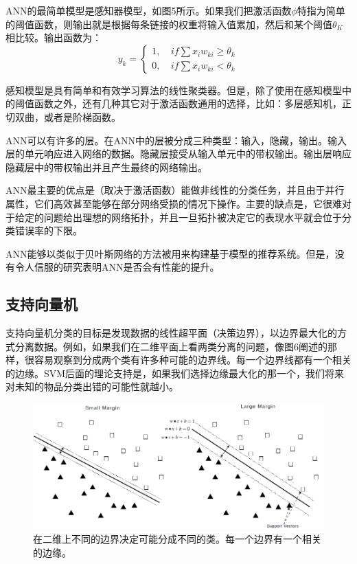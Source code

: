 \documentclass{article}
\begin{document}
ANN的最简单模型是感知器模型，如图5所示。如果我们把激活函数$\phi$特指为简单的阈值函数，则输出就是根据每条链接的权重将输入值累加，然后和某个阈值$\theta_K$相比较。输出函数为：
\[
y_k=\left\{
\begin{array}{ll}
1,\  & if \sum x_iw_{ki}\geq\theta_k \\
0,\  & if \sum x_iw_{ki}<\theta_k
\end{array}
\right.
\]

感知模型是具有简单和有效学习算法的线性聚类器。但是，除了使用在感知模型中的阈值函数之外，还有几种其它对于激活函数通用的选择，比如：多层感知机，正切双曲，或者是阶梯函数。

ANN可以有许多的层。在ANN中的层被分成三种类型：输入，隐藏，输出。输入层的单元响应进入网络的数据。隐藏层接受从输入单元中的带权输出。输出层响应隐藏层中的带权输出并且产生最终的网络输出。

ANN最主要的优点是（取决于激活函数）能做非线性的分类任务，并且由于并行属性，它们高效甚至能够在部分网络受损的情况下操作。主要的缺点是，它很难对于给定的问题给出理想的网络拓扑，并且一旦拓扑被决定它的表现水平就会位于分类错误率的下限。

ANN能够以类似于贝叶斯网络的方法被用来构建基于模型的推荐系统。但是，没有令人信服的研究表明ANN是否会有性能的提升。

\subsection{支持向量机}
支持向量机分类的目标是发现数据的线性超平面（决策边界），以边界最大化的方式分离数据。例如，如果我们在二维平面上看两类分离的问题，像图6阐述的那样，很容易观察到分成两个类有许多种可能的边界线。每一个边界线都有一个相关的边缘。SVM后面的理论支持是，如果我们选择边缘最大化的那一个，我们将来对未知的物品分类出错的可能性就越小。

\begin{figure}[!htb]
	  \begin{center}
	  	\includegraphics[scale=0.5]{f2.6.jpg}
	  	\caption{在二维上不同的边界决定可能分成不同的类。每一个边界有一个相关的边缘。}
	  \end{center}
\end{figure}
\end{document}
